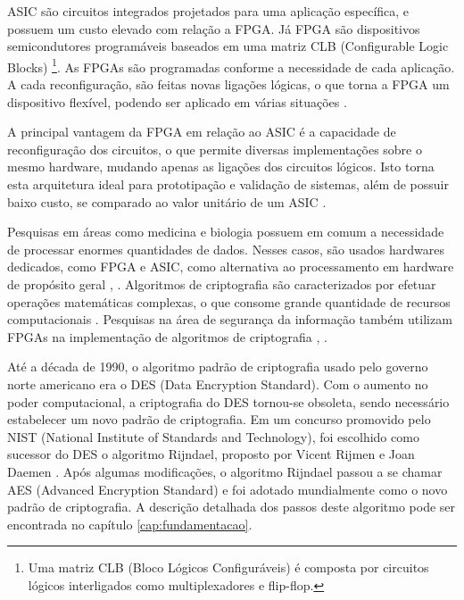 \documentclass{tcc}
\begin{document}
ASIC são circuitos integrados projetados para uma aplicação específica, e possuem um custo elevado com relação a FPGA. Já FPGA são dispositivos semicondutores programáveis baseados em uma matriz CLB (Configurable Logic Blocks) \footnote{Uma matriz CLB (Bloco Lógicos Configuráveis) é composta por circuitos lógicos interligados como multiplexadores e flip-flop.}.
As FPGAs são programadas conforme a necessidade de cada aplicação. A cada reconfiguração, são feitas novas ligações lógicas, o que torna a FPGA um dispositivo flexível, podendo ser aplicado em várias situações \cite{xilinxfpga}.

A principal vantagem da FPGA em relação ao ASIC é a capacidade de reconfiguração dos circuitos, o que permite diversas implementações sobre o mesmo hardware, mudando apenas as ligações dos circuitos lógicos. Isto torna esta arquitetura ideal para prototipação e validação de sistemas, além de possuir baixo custo, se comparado ao valor unitário de um ASIC \cite{gaj2009fpga}.

Pesquisas em áreas como medicina e biologia possuem em comum a necessidade de processar enormes quantidades de dados. Nesses casos, são usados hardwares dedicados, como FPGA e ASIC, como alternativa ao processamento em hardware de propósito geral \cite{MolecularBiology}, \cite{BiologicalSequenceAligment}. Algoritmos de criptografia são caracterizados por efetuar operações matemáticas complexas, o que consome grande quantidade de recursos computacionais \cite{deshpande2009fpga}. Pesquisas na área de segurança da informação também utilizam FPGAs na implementação de algoritmos de criptografia \cite{deshpande2009fpga}, \cite{almeidaconstruccao}.


Até a década de 1990, o algoritmo padrão de criptografia usado pelo governo norte americano era o DES (Data Encryption Standard). Com o aumento no poder computacional, a criptografia do DES tornou-se obsoleta, sendo necessário estabelecer um novo padrão de criptografia. Em um concurso promovido pelo NIST (National Institute of Standards and Technology), foi escolhido como sucessor do DES o algoritmo Rijndael, proposto por Vicent Rijmen e Joan Daemen \cite{pub197}. Após algumas modificações, o algoritmo Rijndael passou a se chamar AES (Advanced Encryption Standard) e foi adotado mundialmente como o novo padrão de criptografia. A descrição detalhada dos passos deste algoritmo pode ser encontrada no capítulo \ref{cap:fundamentacao}.
\end{document}

